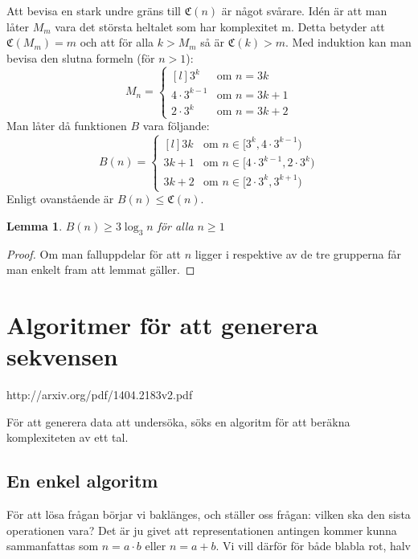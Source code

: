 \documentclass[a4paper,titlepage,draft]{article}
\newcommand{\C}[1]{\mathfrak C \left( #1 \right)}
\newtheorem{lemma}{Lemma}
\theoremstyle{definition}
\begin{document}
    Att bevisa en stark undre gräns till $\C{n}$ är något svårare.
    Idén är att man låter $M_m$ vara det största heltalet som har komplexitet m.
    Detta betyder att $\C{M_m} = m$ och att för alla $k > M_m$ så är $\C{k}>m$.
    Med induktion kan man bevisa den slutna formeln (för $n>1$):
    $$ M_n = \left\{ \begin{matrix*}[l] 3^k & \text{om } n=3k \\
                             4\cdot3^{k-1} & \text{om } n=3k+1 \\
                                 2\cdot3^k & \text{om } n=3k+2 \end{matrix*}
            \right.$$
    Man låter då funktionen $B$ vara följande:
    $$ B(n) = \left\{ \begin{matrix*}[l] 3k & \text{om } n\in[3^k,4\cdot3^{k-1}) \\
                                       3k+1 & \text{om } n\in[4\cdot3^{k-1},2\cdot3^k) \\
                                       3k+2 & \text{om } n\in[2\cdot3^k,3^{k+1}) \end{matrix*}
            \right.$$
    Enligt ovanstående är $B(n)\le\C{n}$.
    \begin{lemma}
        $B(n)\ge 3\log_3 n$ \quad för alla $n\ge1$
    \end{lemma}
    \begin{proof}
       Om man falluppdelar för att $n$ ligger i respektive av de tre grupperna
       får man enkelt fram att lemmat gäller.
    \end{proof}



\section{Algoritmer för att generera sekvensen}

http://arxiv.org/pdf/1404.2183v2.pdf

För att generera data att undersöka, söks en algoritm för att beräkna
komplexiteten av ett tal.

\subsection{En enkel algoritm}

För att lösa frågan börjar vi baklänges, och ställer oss frågan: vilken ska den
sista operationen vara?  Det är ju givet att representationen antingen kommer
kunna sammanfattas som $n = a\cdot b$ eller $n = a+b$.  Vi vill därför för både
blabla rot, halv
\end{document}
